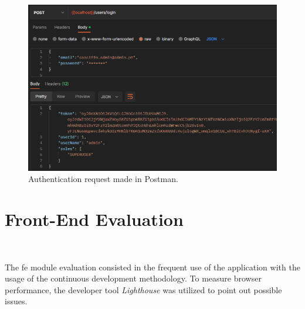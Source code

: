 \begin{figure}[H]
    \centering
    \includegraphics[scale=0.5]{Chapters/img/misc/postman-req-post.png}
    \caption{Authentication request made in Postman.}
    \label{fig:postman-post-req}
\end{figure}


\section{Front-End Evaluation}~\label{ch:eval:sec:fe-eval}

The \acrshort{fe} module evaluation consisted in the frequent use of the application with the usage of the continuous development methodology. To measure browser performance, the developer tool \textit{Lighthouse} was utilized to point out possible issues. 